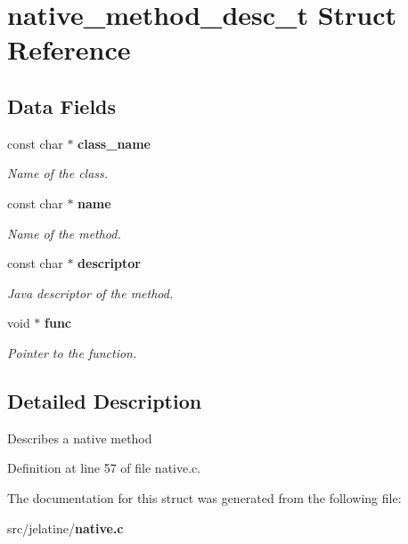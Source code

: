\section{native\_\-method\_\-desc\_\-t Struct Reference}
\label{structnative__method__desc__t}
\subsection*{Data Fields}
\begin{DoxyCompactItemize}
\item 
const char $\ast$ {\bf class\_\-name}\label{structnative__method__desc__t_ab9db921b240f54356a88c8329efcdf31}

\begin{DoxyCompactList}\small\item\em Name of the class. \item\end{DoxyCompactList}\item 
const char $\ast$ {\bf name}\label{structnative__method__desc__t_a9864b32b1d6d6e058aa5556d34e1e138}

\begin{DoxyCompactList}\small\item\em Name of the method. \item\end{DoxyCompactList}\item 
const char $\ast$ {\bf descriptor}\label{structnative__method__desc__t_a57722e648bec63b6f6631828095eddce}

\begin{DoxyCompactList}\small\item\em Java descriptor of the method. \item\end{DoxyCompactList}\item 
void $\ast$ {\bf func}\label{structnative__method__desc__t_a4db0d8e04aa0c68bc8df2b40ded4da9c}

\begin{DoxyCompactList}\small\item\em Pointer to the function. \item\end{DoxyCompactList}\end{DoxyCompactItemize}


\subsection{Detailed Description}
Describes a native method 

Definition at line 57 of file native.c.



The documentation for this struct was generated from the following file:\begin{DoxyCompactItemize}
\item 
src/jelatine/{\bf native.c}\end{DoxyCompactItemize}
